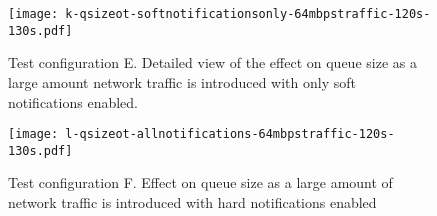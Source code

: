 \begin{figure}[h]
\centering
\texttt{[image: k-qsizeot-softnotificationsonly-64mbpstraffic-120s-130s.pdf]}
\caption{
    Test configuration E.
Detailed view of the effect on queue size as a large amount network traffic is introduced with only soft notifications enabled.
}
\label{fig:plotk}
\centering
\end{figure}

\begin{figure}
\centering
\texttt{[image: l-qsizeot-allnotifications-64mbpstraffic-120s-130s.pdf]}
\caption{Test configuration F. Effect on queue size as a large amount of network traffic is introduced with hard notifications enabled}
\label{fig:plotl}
\end{figure}
